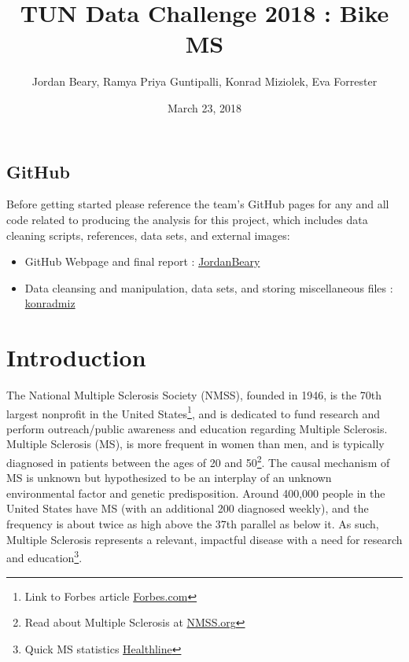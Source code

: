 \documentclass[]{article}
\title{TUN Data Challenge 2018 : Bike MS}
\author{Jordan Beary, Ramya Priya Guntipalli, Konrad Miziolek, Eva Forrester}
\date{March 23, 2018}
\providecommand{\tightlist}{%
  \setlength{\itemsep}{0pt}\setlength{\parskip}{0pt}}
\let\rmarkdownfootnote\footnote%
\def\footnote{\protect\rmarkdownfootnote}
\begin{document}
\maketitle

\hypertarget{github}{%
\subsection{GitHub}\label{github}}

Before getting started please reference the team's GitHub pages for any
and all code related to producing the analysis for this project, which
includes data cleaning scripts, references, data sets, and external
images:

\begin{itemize}
\tightlist
\item
  GitHub Webpage and final report :
  \href{https://github.com/JordanBeary/BikeMS}{JordanBeary}
\item
  Data cleansing and manipulation, data sets, and storing miscellaneous
  files : \href{https://github.com/konradmiz/ETM-527}{konradmiz}
\end{itemize}

\hypertarget{introduction}{%
\section{Introduction}\label{introduction}}

The National Multiple Sclerosis Society (NMSS), founded in 1946, is the
70th largest nonprofit in the United States\footnote{Link to Forbes
  article
  \href{https://www.forbes.com/companies/national-multiple-sclerosis-society/}{Forbes.com}},
and is dedicated to fund research and perform outreach/public awareness
and education regarding Multiple Sclerosis. Multiple Sclerosis (MS), is
more frequent in women than men, and is typically diagnosed in patients
between the ages of 20 and 50\footnote{Read about Multiple Sclerosis at
  \href{https://www.nationalmssociety.org/About-the-Society/MS-Prevalence}{NMSS.org}}.
The causal mechanism of MS is unknown but hypothesized to be an
interplay of an unknown environmental factor and genetic predisposition.
Around 400,000 people in the United States have MS (with an additional
200 diagnosed weekly), and the frequency is about twice as high above
the 37th parallel as below it. As such, Multiple Sclerosis represents a
relevant, impactful disease with a need for research and
education\footnote{Quick MS statistics
  \href{https://www.healthline.com/health/multiple-sclerosis/facts-statistics-infographic}{Healthline}}.
\end{document}
